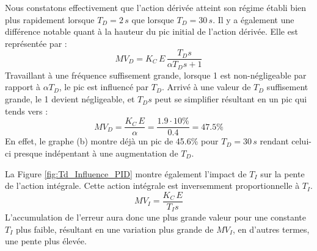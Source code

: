 Nous constatons effectivement que l'action dérivée atteint son régime établi bien plus rapidement lorsque $T_D = 2\,s$ que lorsque $T_D = 30\,s$.
Il y a également une différence notable quant à la hauteur du pic initial de l'action dérivée. Elle est représentée par :
\begin{equation*}
    MV_D = K_C \, E \, \frac{T_D s}{\alpha T_D s + 1}
\end{equation*}
Travaillant à une fréquence suffisement grande, lorsque 1 est non-négligeable par rapport à $\alpha T_D$, le pic est influencé par $T_D$.
Arrivé à une valeur de $T_D$ suffisement grande, le 1 devient négligeable, et $T_D s$ peut se simplifier résultant en un pic qui tends vers :
\begin{equation*}
    MV_D = \frac{K_C \, E}{\alpha} = \frac{1.9 \cdot 10\%}{0.4} = 47.5\%
\end{equation*}
En effet, le graphe (b) montre déjà un pic de 45.6\% pour $T_D = 30\,s$ rendant celui-ci presque indépentant à une augmentation de $T_D$.

La Figure \ref{fig:Td_Influence_PID} montre également l'impact de $T_I$ sur la pente de l'action intégrale.
Cette action intégrale est inversemment proportionnelle à $T_I$.
\begin{equation*}
    MV_I = \frac{K_C \, E}{T_I s}
\end{equation*}
L'accumulation de l'erreur aura donc une plus grande valeur pour une constante $T_I$ plus faible, résultant en une variation plus grande de $MV_I$, en d'autres termes, une pente plus élevée.

